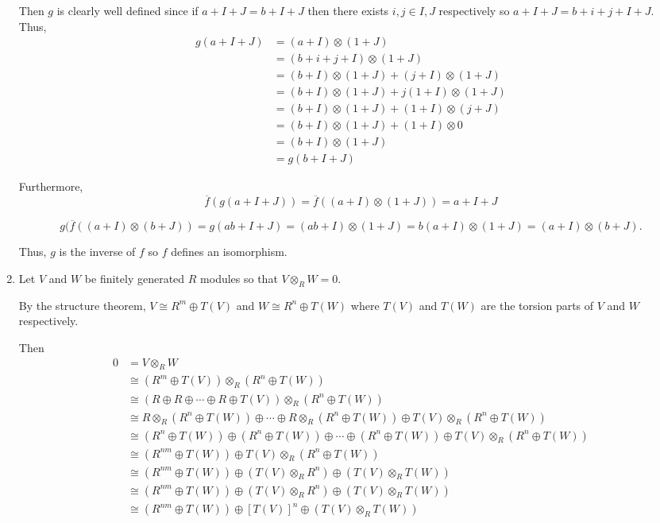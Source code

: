 \documentclass[12pt]{Qual}
\begin{document}
\begin{solution}
\begin{enumerate}[label=(\alph*)]
    Then $g$ is clearly well defined since if $a+I+J=b+I+J$ then there exists $i,j\in I,J$ respectively so $a+I+J=b+i+j+I+J$. Thus, \begin{align*}
        g(a+I+J)&=(a+I)\otimes(1+J)\\
        &=(b+i+j+I)\otimes(1+J)\\
        &=(b+I)\otimes(1+J)+(j+I)\otimes(1+J)\\
        &=(b+I)\otimes(1+J)+j(1+I)\otimes(1+J)\\
        &=(b+I)\otimes(1+J)+(1+I)\otimes(j+J)\\
        &=(b+I)\otimes(1+J)+(1+I)\otimes0\\
        &=(b+I)\otimes(1+J)\\
        &=g(b+I+J)
    \end{align*}

    Furthermore, $$\overline{f}(g(a+I+J))=\overline{f}((a+I)\otimes(1+J))=a+I+J$$

    $$g(\overline{f}((a+I)\otimes(b+J))=g(ab+I+J)=(ab+I)\otimes(1+J)=b(a+I)\otimes(1+J)=(a+I)\otimes(b+J).$$

    Thus, $g$ is the inverse of $f$ so $f$ defines an isomorphism.
    \item Let $V$ and $W$ be finitely generated $R$ modules so that $V\otimes_RW=0$.

    By the structure theorem, $V\cong R^m\oplus T(V)$ and $W\cong R^n\oplus T(W)$ where $T(V)$ and $T(W)$ are the torsion parts of $V$ and $W$ respectively.

    Then \begin{align*}
        0&=V\otimes_RW\\
        &\cong(R^m\oplus T(V))\otimes_R(R^n\oplus T(W))\\
        &\cong(R\oplus R\oplus\cdots\oplus R\oplus T(V))\otimes_R(R^n\oplus T(W))\\
        &\cong R\otimes_R(R^n\oplus T(W))\oplus \cdots\oplus R\otimes_R(R^n\oplus T(W))\oplus T(V)\otimes_R(R^n\oplus T(W))\\
        &\cong (R^n\oplus T(W))\oplus (R^n\oplus T(W))\oplus\cdots\oplus (R^n\oplus T(W))\oplus T(V)\otimes_R(R^n\oplus T(W))\\
        &\cong (R^{nm}\oplus T(W))\oplus T(V)\otimes_R(R^n\oplus T(W))\\
        &\cong (R^{nm}\oplus T(W))\oplus (T(V)\otimes_R R^n)\oplus (T(V)\otimes_R T(W))\\
        &\cong (R^{nm}\oplus T(W))\oplus (T(V)\otimes_R R^n)\oplus (T(V)\otimes_R T(W))\\
        &\cong (R^{nm}\oplus T(W))\oplus [T(V)]^n \oplus (T(V)\otimes_R T(W))
    \end{align*}


\end{enumerate}
\end{solution}
\end{document}
